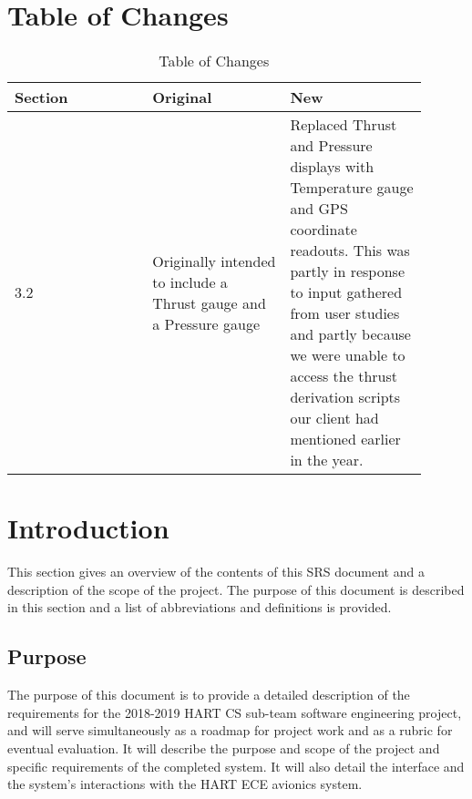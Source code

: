 \documentclass[onecolumn, draftclsnofoot,10pt, compsoc]{IEEEtran}
\begin{document}
	\newpage
	\tableofcontents
	\clearpage


  \section{Table of Changes}

  \begin{center}
  \begin{table}[h!]
  \begin{tabular}{|p{0.3\linewidth}|p{0.3\linewidth}|p{0.3\linewidth}|} 
    \hline
    \textbf{Section} & \textbf{Original} & \textbf{New} \\
    \hline
    3.2 & Originally intended to include a Thrust gauge and a Pressure gauge & Replaced Thrust and Pressure displays with Temperature gauge and GPS coordinate readouts. This was partly in response to input gathered from user studies and partly because we were unable to access the thrust derivation scripts our client had mentioned earlier in the year. \\ 
    \hline
  \end{tabular}
  \caption{Table of Changes}
  \label{table:1}
  \end{table}
  \end{center}
  \newpage
  
	\section{Introduction}
		
		This section gives an overview of the contents of this SRS document and a description of the scope of the project.
		The purpose of this document is described in this section and a list of abbreviations and definitions is provided.
	
		\subsection{Purpose}
			The purpose of this document is to provide a detailed description of the requirements for the 2018-2019 HART CS sub-team software engineering project, and will serve simultaneously as a roadmap for project work and as a rubric for eventual evaluation. 
			It will describe the purpose and scope of the project and specific requirements of the completed system. 
			It will also detail the interface and the system's interactions with the HART ECE avionics system.
\end{document}
